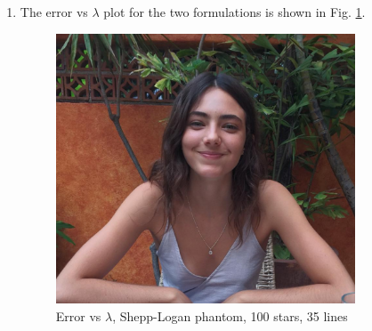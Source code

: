 \begin{enumerate}
\item The error vs $\lambda$ plot for the two formulations is shown in Fig. \ref{fig:expt45}.

 \begin{figure}[t!]
	\centering \vspace{-0.1in}
	\includegraphics[width=3.5in]{images/expt4/5.png}
	 \caption[Error vs $\lambda$, Shepp-Logan phantom, 100 stars, 35 lines ]{\small Error vs $\lambda$, Shepp-Logan phantom, 100 stars, 35 lines}
	\label{fig:expt45}
\end{figure}



\end{enumerate}

